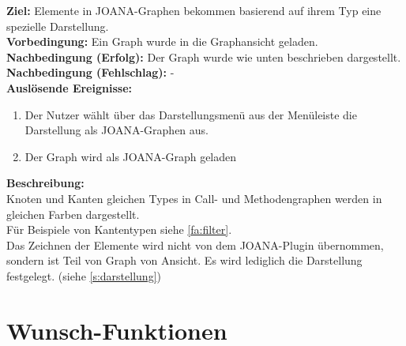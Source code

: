 \label{fa:joanaview}
\textbf{Ziel:} Elemente in JOANA-Graphen bekommen basierend auf ihrem Typ eine spezielle Darstellung.\\
\textbf{Vorbedingung:} Ein Graph wurde in die Graphansicht geladen.\\
\textbf{Nachbedingung (Erfolg):} Der Graph wurde wie unten beschrieben dargestellt.\\
\textbf{Nachbedingung (Fehlschlag):} -\\
\textbf{Auslösende Ereignisse:}
\begin{enumerate}[nolistsep, label=(\alph*)]
  \item Der Nutzer wählt über das Darstellungsmenü aus der Menüleiste die Darstellung als JOANA-Graphen aus.
  \item Der Graph wird als JOANA-Graph geladen
\end{enumerate}
\textbf{Beschreibung:}\\
Knoten und Kanten gleichen Types in Call- und Methodengraphen werden in gleichen Farben dargestellt.\\
Für Beispiele von Kantentypen siehe \ref{fa:filter}.\\
Das Zeichnen der Elemente wird nicht von dem JOANA-Plugin übernommen, sondern ist Teil von Graph von Ansicht. %
Es wird lediglich die Darstellung festgelegt. (siehe \ref{s:darstellung})


\label{fa:joanatyp}
\section{Wunsch-Funktionen}

